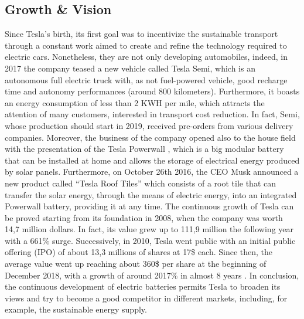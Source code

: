 \subsection{Growth \& Vision}
Since Tesla's birth, its first goal was to incentivize the sustainable transport through a constant work aimed to create and refine the technology required to electric cars. Nonetheless, they are not only developing automobiles, indeed, in 2017 the company teased a new vehicle called Tesla Semi, which is an autonomous full electric truck with, as not fuel-powered vehicle, good recharge time and autonomy performances (around 800 kilometers). Furthermore, it boasts an energy consumption of less than 2 KWH per mile, which attracts the attention of many customers, interested in transport cost reduction. In fact, Semi, whose production should start in 2019, received pre-orders from various delivery companies.  
Moreover, the business of the company opened also to the house field with the presentation of the Tesla Powerwall \cite{Powerwall}, which is a big modular battery that can be installed at home and allows the storage of electrical energy produced by solar panels. Furthermore, on October 26th 2016, the CEO Musk announced a new product called “Tesla Roof Tiles” which consists of a root tile that can transfer the solar energy, through the means of electric energy, into an integrated Powerwall battery, providing it at any time.
The continuous growth of Tesla can be proved starting from its foundation in 2008, when the company was worth 14,7 million dollars. In fact, its value grew up to 111,9 million the following year with a 661\% surge. Successively, in 2010, Tesla went public with an initial public offering (IPO) of about 13,3 millions of shares at 17\$ each. Since then, the average value went up reaching about 360\$ per share at the beginning of December 2018, with a growth of around 2017\% in almost 8 years \cite{Growth}. 
In conclusion, the continuous development of electric batteries permits Tesla to broaden its views and try to become a good competitor in different markets, including, for example, the sustainable energy supply.



